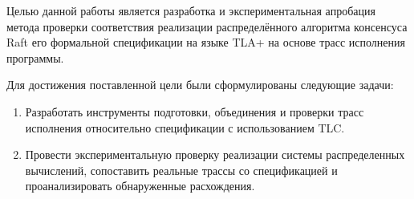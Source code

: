 Целью данной работы является разработка и экспериментальная апробация метода
проверки соответствия реализации распределённого алгоритма консенсуса Raft его
формальной спецификации на языке TLA+ на основе трасс исполнения программы.

Для достижения поставленной цели были сформулированы следующие задачи:

\begin{enumerate}
    \item Разработать инструменты подготовки, объединения и проверки трасс
исполнения относительно спецификации с использованием TLC.
    \item Провести экспериментальную проверку реализации системы распределенных
вычислений, сопоставить реальные трассы со спецификацией и проанализировать
обнаруженные расхождения.
\end{enumerate}
